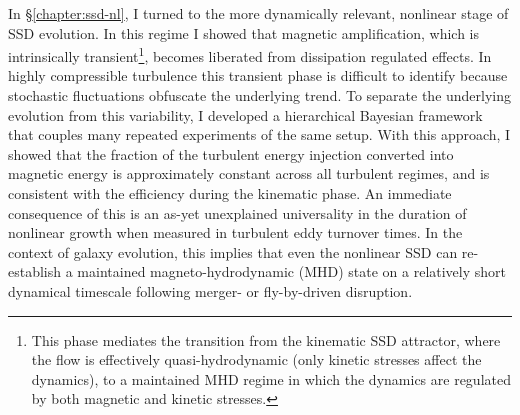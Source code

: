 In \S\ref{chapter:ssd-nl}, I turned to the more dynamically relevant, nonlinear stage of SSD evolution. In this regime I showed that magnetic amplification, which is intrinsically transient\footnote{
    This phase mediates the transition from the kinematic SSD attractor, where the flow is effectively quasi-hydrodynamic (only kinetic stresses affect the dynamics), to a maintained MHD regime in which the dynamics are regulated by both magnetic and kinetic stresses.
}, becomes liberated from dissipation regulated effects. In highly compressible turbulence this transient phase is difficult to identify because stochastic fluctuations obfuscate the underlying trend. To separate the underlying evolution from this variability, I developed a hierarchical Bayesian framework that couples many repeated experiments of the same setup. With this approach, I showed that the fraction of the turbulent energy injection converted into magnetic energy is approximately constant across all turbulent regimes, and is consistent with the efficiency during the kinematic phase. An immediate consequence of this is an as-yet unexplained universality in the duration of nonlinear growth when measured in turbulent eddy turnover times. In the context of galaxy evolution, this implies that even the nonlinear SSD can re-establish a maintained magneto-hydrodynamic (MHD) state on a relatively short dynamical timescale following merger- or fly-by-driven disruption.

